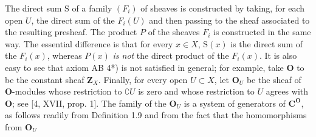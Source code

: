 The direct sum $\mathrm S$ of a family $(F_i)$ of sheaves is constructed by taking,
for each open $U$, the direct sum of the $F_i(U)$ and then passing to the
sheaf associated to the resulting presheaf. The product $P$ of the sheaves
$F_i$ is constructed in the same way. The essential difference is that for
every $x\in X$, $\mathrm S(x)$ is the direct sum of the $F_i(x)$, whereas $P(x)$ \textit{is
not} the direct product of the $F_i(x)$. It is also easy to see that axiom
AB 4*) is not satisfied in general; for example, take $\mathbf O$ to be the
constant sheaf $\mathbf Z_X$. Finally, for every open $U\subset X$, let
$\mathbf O_U$ be the sheaf of $\mathbf O$-modules whose restriction to $\complement U$
is zero and whose restriction to $U$ agrees with $\mathbf O$; see [4, XVII,
prop. 1]. The family of the $\mathbf O_U$ is a system of generators of
$\mathbf C^{\mathbf O}$, as follows readily from Definition 1.9 and from the fact
that the homomorphisms from $\mathbf O_U$


